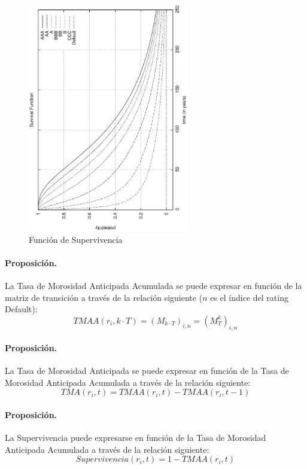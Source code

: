 \begin{figure}[!hb]
\begin{center}
\includegraphics[height=10cm, angle=-90]{./images/survival.ps}
\caption{Funci\'on de Supervivencia}
\label{survival}
\end{center}
\end{figure}

\paragraph{Proposici\'on.} La Tasa de Morosidad Anticipada Acumulada se 
puede expresar en funci\'on de la matriz de transici\'on a trav\'es de la
relaci\'on siguiente ($n$ es el \'indice del rating Default):
\begin{displaymath}
TMAA(r_i,k \cdot T) = (M_{k \cdot T})_{i,n} = (M_{T}^{k})_{i,n}
\end{displaymath}

\paragraph{Proposici\'on.} La Tasa de Morosidad Anticipada se puede expresar 
en funci\'on de la Tasa de Morosidad Anticipada Acumulada a trav\'es de la
relaci\'on siguiente:
\begin{displaymath}
TMA(r_i, t) =  TMAA(r_i, t) - TMAA(r_i, t-1)
\end{displaymath}

\paragraph{Proposici\'on.} La Supervivencia puede expresarse en funci\'on de
la Tasa de Morosidad Anticipada Acumulada a trav\'es de la relaci\'on siguiente:
\begin{displaymath}
Supervivencia(r_i, t) =  1 - TMAA(r_i, t)
\end{displaymath}

